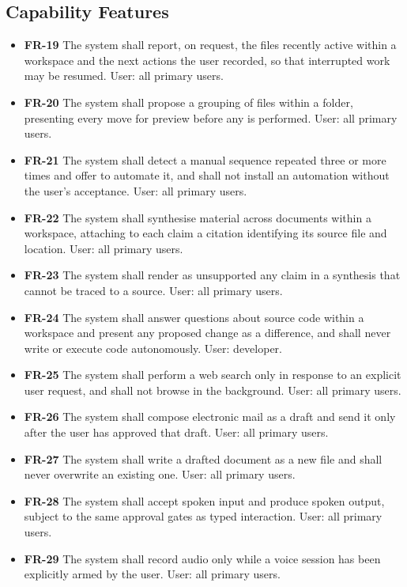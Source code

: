 \documentclass{FastFyp}
\begin{document}
\subsection{Capability Features}
\begin{itemize}
    \item \textbf{FR-19} The system shall report, on request, the files recently active within a workspace and the next actions the user recorded, so that interrupted work may be resumed. User: all primary users.
    \item \textbf{FR-20} The system shall propose a grouping of files within a folder, presenting every move for preview before any is performed. User: all primary users.
    \item \textbf{FR-21} The system shall detect a manual sequence repeated three or more times and offer to automate it, and shall not install an automation without the user's acceptance. User: all primary users.
    \item \textbf{FR-22} The system shall synthesise material across documents within a workspace, attaching to each claim a citation identifying its source file and location. User: all primary users.
    \item \textbf{FR-23} The system shall render as unsupported any claim in a synthesis that cannot be traced to a source. User: all primary users.
    \item \textbf{FR-24} The system shall answer questions about source code within a workspace and present any proposed change as a difference, and shall never write or execute code autonomously. User: developer.
    \item \textbf{FR-25} The system shall perform a web search only in response to an explicit user request, and shall not browse in the background. User: all primary users.
    \item \textbf{FR-26} The system shall compose electronic mail as a draft and send it only after the user has approved that draft. User: all primary users.
    \item \textbf{FR-27} The system shall write a drafted document as a new file and shall never overwrite an existing one. User: all primary users.
    \item \textbf{FR-28} The system shall accept spoken input and produce spoken output, subject to the same approval gates as typed interaction. User: all primary users.
    \item \textbf{FR-29} The system shall record audio only while a voice session has been explicitly armed by the user. User: all primary users.
\end{itemize}
\end{document}
